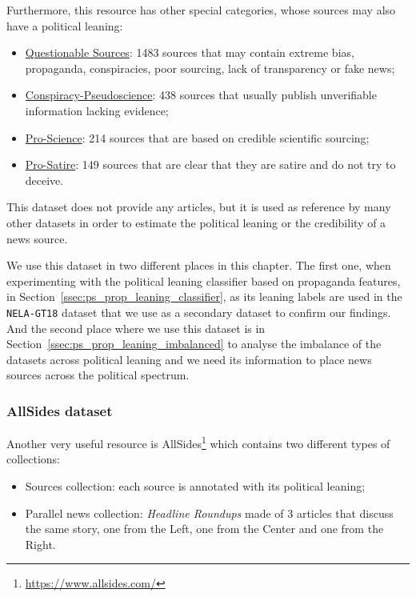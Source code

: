 Furthermore, this resource has other special categories, whose sources may also have a political leaning:

\begin{itemize}
    \item \href{https://mediabiasfactcheck.com/fake-news/}{Questionable Sources}: 1483 sources that may contain extreme bias, propaganda, conspiracies, poor sourcing, lack of transparency or fake news;
    \item \href{https://mediabiasfactcheck.com/conspiracy/}{Conspiracy-Pseudoscience}: 438 sources that usually publish unverifiable information lacking evidence;
    \item \href{https://mediabiasfactcheck.com/pro-science/}{Pro-Science}: 214 sources that are based on credible scientific sourcing;
    \item \href{https://mediabiasfactcheck.com/satire/}{Pro-Satire}: 149 sources that are clear that they are satire and do not try to deceive.
\end{itemize}

This dataset does not provide any articles, but it is used as reference by many other datasets in order to estimate the political leaning or the credibility of a news source.

We use this dataset in two different places in this chapter.
The first one, when experimenting with the political leaning classifier based on propaganda features, in Section~\ref{ssec:ps_prop_leaning_classifier}, as its leaning labels are used in the \texttt{NELA-GT18} dataset that we use as a secondary dataset to confirm our findings.
And the second place where we use this dataset is in Section~\ref{ssec:ps_prop_leaning_imbalanced} to analyse the imbalance of the datasets across political leaning and we need its information to place news sources across the political spectrum.

\subsubsection{AllSides dataset}

Another very useful resource is AllSides\footnote{\url{https://www.allsides.com/}} which contains two different types of collections:

\begin{itemize}
    \item Sources collection: each source is annotated with its political leaning;
    \item Parallel news collection: \emph{Headline Roundups\texttrademark} made of 3 articles that discuss the same story, one from the Left, one from the Center and one from the Right.
\end{itemize}

